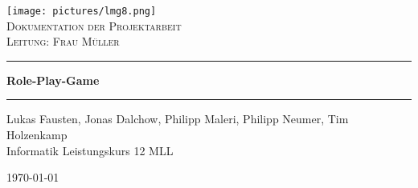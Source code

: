 \begin{titlepage}

\begin{center}


\texttt{[image: pictures/lmg8.png]}\\[1.5cm]


\textsc{\Large Dokumentation der Projektarbeit }\\[0.4cm]

\textsc{Leitung: Frau Müller}\\[0.4cm]


\noindent\rule{1\textwidth}{0.75pt}
\vspace{0.4cm}


{ \huge \bfseries Role-Play-Game}\\[0.3cm]
\vspace{0.1cm}
\noindent\rule{1\textwidth}{0.75pt}
\vspace{0.4cm}


\begin{minipage}{0.4\textwidth}
\begin{flushleft} \large


\end{flushleft}
\end{minipage}
\hfill
\begin{minipage}{0.5\textwidth}
\begin{flushright} \large
\vspace{1cm}
Lukas Fausten, Jonas Dalchow, Philipp Maleri, Philipp Neumer, Tim Holzenkamp \\
\vspace{0.5cm}
Informatik Leistungskurs 12 MLL\\[0.8cm]




\end{flushright}
\end{minipage}

\vfill

{\large \today} 



\end{center}

\end{titlepage}

\newpage

